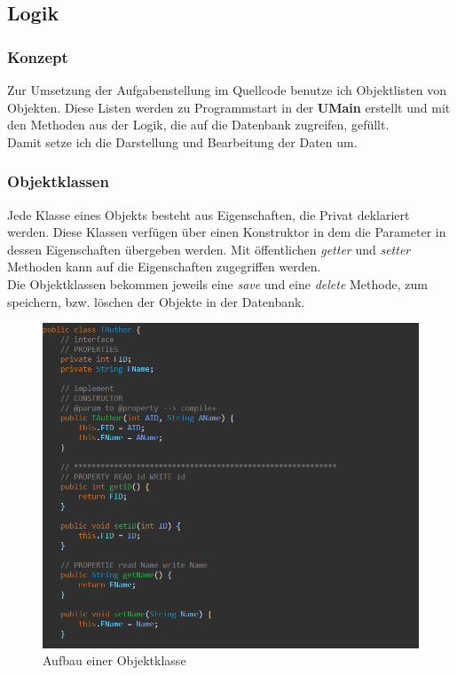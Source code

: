 \subsection{Logik}
\subsubsection{Konzept}
Zur Umsetzung der Aufgabenstellung im Quellcode benutze ich Objektlisten von Objekten.
Diese Listen werden zu Programmstart in der \textbf{UMain} erstellt und mit den Methoden aus der Logik, die auf die Datenbank zugreifen, gefüllt.\\
Damit setze ich die Darstellung und Bearbeitung der Daten um.\\
\subsubsection{Objektklassen}
Jede Klasse eines Objekts besteht aus Eigenschaften, die Privat deklariert werden. Diese Klassen verfügen über einen Konstruktor in dem die Parameter in dessen Eigenschaften übergeben werden. Mit öffentlichen \textit{getter} und \textit{setter} Methoden kann auf die Eigenschaften zugegriffen werden.\\
Die Objektklassen bekommen jeweils eine \textit{save} und eine \textit{delete} Methode, zum speichern, bzw. löschen der Objekte in der Datenbank.
\begin{figure}[h]
\begin{center}
\includegraphics[width=15cm]{img/objekt.png}
\caption{Aufbau einer Objektklasse}
\label{objekt}
\end{center}
\end{figure}

